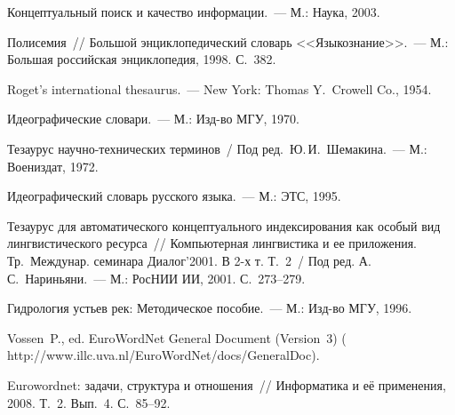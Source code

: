 \begin{multicols}{2}
{{\begin{thebibliography}{99}
     Концептуальный поиск и качество информации.~--- М.: Наука, 2003.
     
     Полисемия~// Большой энциклопедический словарь <<Языкознание>>.~--- М.: Большая 
российская энциклопедия, 1998. С.~382.

    
     Roget's international thesaurus.~--- New York: Thomas Y.~Crowell Co., 1954.
     
     Идеографические словари.~--- М.: Изд-во МГУ, 1970.

     Тезаурус научно-технических терминов~/ Под ред.\ Ю.\,И.~Шемакина.~--- М.: 
Воениздат, 1972.     
    
     Идеографический словарь русского языка.~--- М.: ЭТС, 1995.
          
             
     Тезаурус для автоматического концептуального индексирования как особый вид 
лингвистического ресурса~// Компьютерная лингвистика и ее приложения. Тр.\ Междунар. 
семинара Диалог'2001. В 2-х т. Т.~2~/ Под ред. А.\,С.~Нариньяни.~--- М.: РосНИИ ИИ, 2001. 
С.~273--279.

     Гидрология устьев рек: Методическое пособие.~--- М.: Изд-во МГУ, 1996.
     
     Vossen~P., ed. EuroWordNet General Document (Version~3) ({\sf 
http://www.illc.uva.nl/EuroWordNet/docs/\linebreak GeneralDoc}).

\label{end\stat}
     
     Eurowordnet: задачи, структура и отношения~// Информатика и её применения, 2008. 
Т.~2. Вып.~4. С.~85--92.
     
\end{thebibliography}
}
}
\end{multicols} 
 